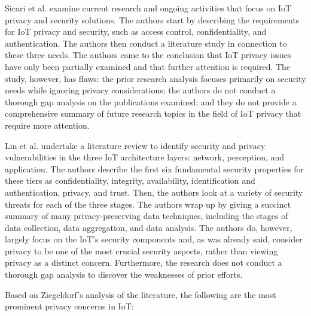 \documentclass[conference]{IEEEtran}
\begin{document}
Sicari et al. \cite{sicari2015security} examine current research and ongoing
activities that focus on IoT privacy and security solutions. The authors
start by describing the requirements for IoT privacy and security, such
as access control, confidentiality, and authentication. The authors then
conduct a literature study in connection to these three needs. The authors
came to the conclusion that IoT privacy issues have only been partially
examined and that further attention is required. The study, however, has
flaws: the prior research analysis focuses primarily on security needs while
ignoring privacy considerations; the authors do not conduct a thorough gap
analysis on the publications examined; and they do not provide a comprehensive
summary of future research topics in the field of IoT privacy that require
more attention.

Lin et al. \cite{LinSurvey} undertake a literature review to identify security
and privacy vulnerabilities in the three IoT architecture layers: network,
perception, and application. The authors describe the first six fundamental
security properties for these tiers as confidentiality, integrity, availability,
identification and authentication, privacy, and trust. Then, the authors
look at a variety of security threats for each of the three stages. The
authors wrap up by giving a succinct summary of many privacy-preserving
data techniques, including the stages of data collection, data aggregation,
and data analysis. The authors do, however, largely focus on the IoT's security
components and, as was already said, consider privacy to be one of the most
crucial security aspects, rather than viewing privacy as a distinct concern.
Furthermore, the research does not conduct a thorough gap analysis to discover
the weaknesses of prior efforts.

Based on Ziegeldorf's \cite{ziegeldorf2014privacy} analysis of the literature,
the following are the most prominent privacy concerns in IoT:
\end{document}
